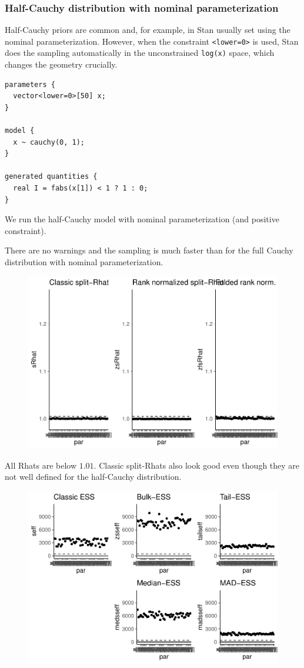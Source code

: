 \documentclass[american,]{article}
\begin{document}
\hypertarget{half-cauchy-distribution-with-nominal-parameterization}{%
\subsubsection*{Half-Cauchy distribution with nominal
parameterization}\label{half-cauchy-distribution-with-nominal-parameterization}}

Half-Cauchy priors are common and, for example, in Stan usually set
using the nominal parameterization. However, when the constraint
\texttt{\textless{}lower=0\textgreater{}} is used, Stan does the
sampling automatically in the unconstrained \texttt{log(x)} space, which
changes the geometry crucially.

\begin{verbatim}
parameters {
  vector<lower=0>[50] x;
}

model {
  x ~ cauchy(0, 1);
}

generated quantities {
  real I = fabs(x[1]) < 1 ? 1 : 0;
}
\end{verbatim}

We run the half-Cauchy model with nominal parameterization (and positive
constraint).

There are no warnings and the sampling is much faster than for the full
Cauchy distribution with nominal parameterization.

\begin{figure}[t]
  \centering
  \includegraphics[width=0.6\linewidth]{graphics/rhat-fit-half-nom-1.pdf}
\end{figure}

All Rhats are below \(1.01\). Classic split-Rhats also look good even
though they are not well defined for the half-Cauchy distribution.

\begin{figure}[t]
  \centering
  \includegraphics[width=0.6\linewidth]{graphics/ess-fit-half-nom-1.pdf}
\end{figure}
\end{document}
